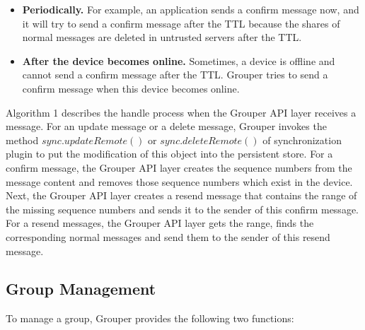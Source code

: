 \documentclass[twocolumn,10pt]{article}
\begin{document}
\begin{itemize}
	\setlength{\itemsep}{1pt}
	\setlength{\parskip}{0pt}
	\setlength{\parsep}{0pt}
	\item \textbf{Periodically.}
	For example, an application sends a confirm message now, and it will try to send a confirm message after the TTL because the shares of normal messages are deleted in untrusted servers after the TTL.
	\item \textbf{After the device becomes online.} 
	Sometimes, a device is offline and cannot send a confirm message after the TTL.
	Grouper tries to send a confirm message when this device becomes online.
\end{itemize}

Algorithm 1 describes the handle process when the Grouper API layer receives a message.
For an update message or a delete message, Grouper invokes the method $sync.updateRemote()$ or $sync.deleteRemote()$ of synchronization plugin to put the modification of this object into the persistent store.
For a confirm message, the Grouper API layer creates the sequence numbers from the message content and removes those sequence numbers which exist in the device.
Next, the Grouper API layer creates a resend message that contains the range of the missing sequence numbers and sends it to the sender of this confirm message.
For a resend messages, the Grouper API layer gets the range, finds the corresponding normal messages and send them to the sender of this resend message.

\subsection{Group Management}

To manage a group, Grouper provides the following two functions:
\end{document}
